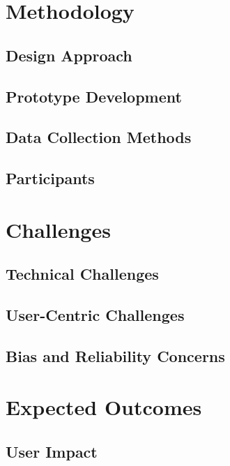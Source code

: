 \documentclass{imc-inf}
\begin{document}
\chapter{Methodology}
\section{Design Approach}
\section{Prototype Development}
\section{Data Collection Methods}
\section{Participants}



\chapter{Challenges}
\section{Technical Challenges}%
\section{User-Centric Challenges}%
\section{Bias and Reliability Concerns}%



\chapter{Expected Outcomes}
\section{User Impact}%
\end{document}
